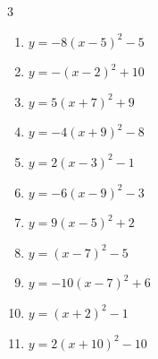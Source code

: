 \begin{multicols}{3}
\begin{enumerate}
        \phantom{$\displaystyle 頂点\left( 2 , 2 \right)$}

  \item $\displaystyle y=-8\left( x-5\right)^{2}-5$

        \phantom{$\displaystyle 頂点\left( 5 , -5 \right)$}

  \item $\displaystyle y=-\left( x-2\right)^{2}+10$

        \phantom{$\displaystyle 頂点\left( 2 , 10 \right)$}

  \item $\displaystyle y=5\left( x+7\right)^{2}+9$

        \phantom{$\displaystyle 頂点\left( -7 , 9 \right)$}

  \item $\displaystyle y=-4\left( x+9\right)^{2}-8$

        \phantom{$\displaystyle 頂点\left( -9 , -8 \right)$}

  \item $\displaystyle y=2\left( x-3\right)^{2}-1$

        \phantom{$\displaystyle 頂点\left( 3 , -1 \right)$}

\columnbreak %

\resetques

  \item $\displaystyle y=-6\left( x-9\right)^{2}-3$

        \phantom{$\displaystyle 頂点\left( 9 , -3 \right)$}

  \item $\displaystyle y=9\left( x-5\right)^{2}+2$

        \phantom{$\displaystyle 頂点\left( 5 , 2 \right)$}

  \item $\displaystyle y=\left( x-7\right)^{2}-5$

        \phantom{$\displaystyle 頂点\left( 7 , -5 \right)$}

  \item $\displaystyle y=-10\left( x-7\right)^{2}+6$

        \phantom{$\displaystyle 頂点\left( 7 , 6 \right)$}

  \item $\displaystyle y=\left( x+2\right)^{2}-1$

        \phantom{$\displaystyle 頂点\left( -2 , -1 \right)$}

  \item $\displaystyle y=2\left( x+10\right)^{2}-10$


\end{enumerate}
\end{multicols}
